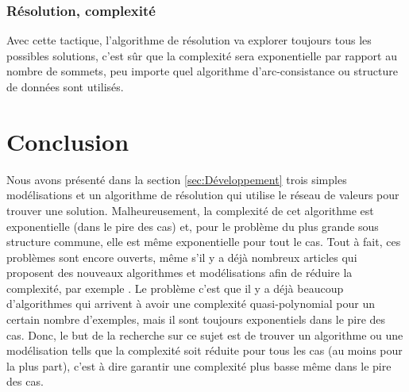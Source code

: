 \documentclass[french]{article}
\theoremstyle{definition}
\theoremstyle{remark}
\begin{document}
\subsubsection{Résolution, complexité}
Avec cette tactique, l'algorithme de résolution va explorer toujours tous les possibles solutions, c'est sûr que la complexité sera exponentielle par rapport au nombre de sommets, peu importe quel algorithme d'arc-consistance ou structure de données sont utilisés. 

\newpage
\section{Conclusion}
\label{sec:conc}
Nous avons présenté dans la section \ref{sec:Développement} trois simples modélisations et un algorithme de résolution qui utilise le réseau de valeurs pour trouver une solution. Malheureusement, la complexité de cet algorithme est exponentielle (dans le pire des cas) et, pour le problème du plus grande sous structure commune, elle est même exponentielle pour tout le cas. Tout à fait, ces problèmes sont encore ouverts, même s'il y a déjà nombreux articles qui proposent des nouveaux algorithmes et modélisations afin de réduire la complexité, par exemple \cite{SorlinS082010,SorlinS08, TakapouiB16}. Le problème c'est que il y a déjà beaucoup d'algorithmes qui arrivent à avoir une complexité quasi-polynomial pour un certain nombre d'exemples, mais il sont toujours exponentiels dans le pire des cas. Donc, le but de la recherche sur ce sujet est de trouver un algorithme ou une modélisation tells que la complexité soit réduite pour tous les cas (au moins pour la plus part), c'est à dire garantir une complexité plus basse même dans le pire des cas.



\newpage


\end{document}

